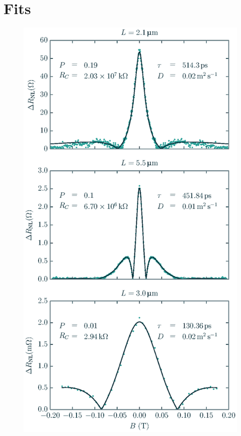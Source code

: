 \section{Fits}
\label{s:fits}

\begin{figure}
  \caption{\plotDifferenceInfo}
  \includegraphics[width=\columnwidth]{figures/plot_difference}
\end{figure}
